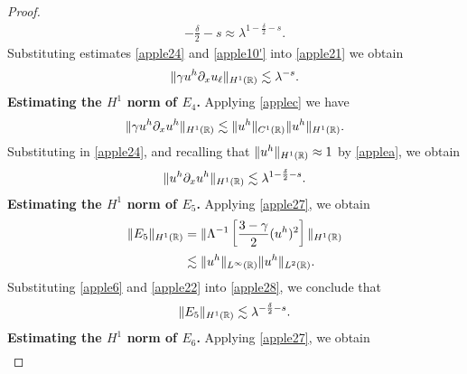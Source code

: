 \begin{proof}
\begin{equation}
\begin{split}
{		-\frac{\delta}{2} -s}
		\approx \lambda^{1- \frac{\delta}{2} -s}.
		\label{apple24}
	\end{split}
\end{equation}
Substituting estimates \eqref{apple24} and  \eqref{apple10'} into \eqref{apple21} we obtain
\begin{equation}
	\begin{split}
		\|\gamma u^h \partial_x u_\ell \|_{H^1(\mathbb{R})} \lesssim \lambda^{-s}.
		\label{apple24'}
	\end{split}
\end{equation}
%
{\bf Estimating the $H^1$ norm of $\hyperref[all_errors_together]{E_4}$.} Applying  \cref{applec} we have
\begin{equation}
	\begin{split}
		\|\gamma u^h \partial_x u^h\|_{H^1(\mathbb{R})} \lesssim \|u^h\|_{C^1(\mathbb{R})}
		\|u^h\|_{H^1(\mathbb{R})}.
		\label{apple25}
	\end{split}
\end{equation}
Substituting in \eqref{apple24}, and recalling that $\|u^h\|_{H^1(\mathbb{R})} \approx 1$ by 
\cref{applea}, we obtain
\begin{equation}
	\begin{split}
		\|u^h \partial_x u^h \|_{H^1(\mathbb{R})} \lesssim \lambda^{1-\frac{\delta}{2}-s}.
		\label{apple26}
	\end{split}
\end{equation}
%
%
%
{\bf Estimating the $H^1$ norm of $\hyperref[all_errors_together]{E_5}$.}
Applying \eqref{apple27}, we obtain
\begin{equation}
	\begin{split}
		\|E_5\|_{H^1(\mathbb{R})}
		& = \|\Lambda^{-1}\left[ \frac{3-\gamma}{2}(u^h)^2
		\right]\|_{H^1(\mathbb{R})}
		\\
		& \lesssim \|u^h\|_{L^\infty(\mathbb{R})} \|u^h\|_{L^2(\mathbb{R})}.
		\label{apple28}
	\end{split}
\end{equation}
Substituting \eqref{apple6} and \eqref{apple22} into \eqref{apple28}, we conclude that
\begin{equation}
	\begin{split}
		\|E_5\|_{H^1(\mathbb{R})} \lesssim \lambda^{-\frac{\delta}{2}-s}.
		\label{apple29}
	\end{split}
\end{equation}
%
%
%
%
%
{\bf Estimating the $H^1$ norm of $\hyperref[all_errors_together]{E_6}$.} Applying \eqref{apple27}, we obtain
\begin{equation}
	\begin{split}

\end{split}
\end{equation}
\end{proof}
